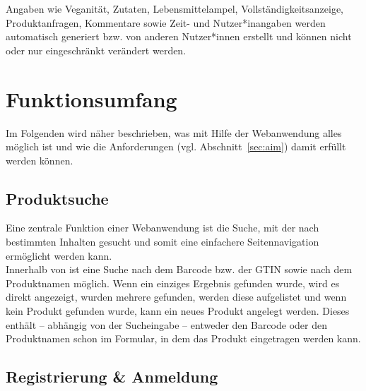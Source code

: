 Angaben wie Veganität, Zutaten, Lebensmittelampel,
Vollständigkeitsanzeige, Produktanfragen, Kommentare sowie Zeit- und
Nutzer*inangaben werden automatisch generiert bzw. von anderen
Nutzer*innen erstellt und können nicht
oder nur eingeschränkt verändert werden.

\section{Funktionsumfang}
\label{sec:concept:functions}

Im Folgenden wird näher beschrieben, was mit Hilfe der Webanwendung
alles möglich ist und wie die Anforderungen (vgl.
Abschnitt~\ref{sec:aim}) damit erfüllt werden können.

\subsection{Produktsuche}
\label{sec:concept:search}

Eine zentrale Funktion einer Webanwendung ist die Suche, mit der nach
bestimmten Inhalten gesucht und somit eine einfachere Seitennavigation
ermöglicht werden kann.\\
Innerhalb von \name ist eine Suche nach dem Barcode bzw. der \ac{GTIN}
sowie nach dem Produktnamen möglich.
Wenn ein einziges Ergebnis gefunden wurde, wird es direkt angezeigt,
wurden mehrere gefunden, werden diese aufgelistet und wenn kein
Produkt gefunden wurde, kann ein neues Produkt
angelegt werden.
Dieses enthält -- abhängig von der Sucheingabe --
entweder den Barcode oder den Produktnamen schon im Formular, in dem
das Produkt eingetragen werden kann.

\subsection{Registrierung \& Anmeldung}
\label{sec:concept:users}

